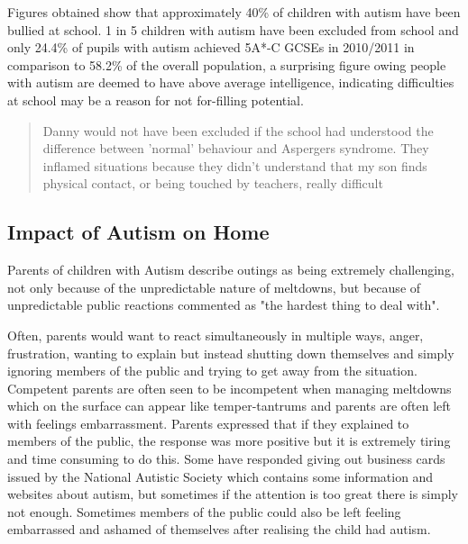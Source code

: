 \documentclass[11pt]{report}
\begin{document}
Figures obtained show that approximately 40\% of children with autism have been bullied at school. 1 in 5 children with autism have been excluded from school \cite{nasschool} and only 24.4\% of pupils with autism achieved 5A*-C GCSEs in 2010/2011 in comparison to 58.2\% of the overall population\cite{statsandfacts}, a surprising figure owing people with autism are deemed to have above average intelligence, indicating difficulties at school may be a reason for not for-filling potential. 

\begin{quote}
Danny would not have been excluded if the school had understood the difference between 'normal' behaviour and Aspergers syndrome. They inflamed situations because they didn't understand that my son finds physical contact, or being touched by teachers, really difficult \cite{nasschool}
\end{quote}


\subsection{Impact of Autism on Home}
Parents of children with Autism describe outings as being extremely challenging, not only because of the unpredictable nature of meltdowns, but because of unpredictable public reactions\cite{meltdowns_goingout} commented as "the hardest thing to deal with"\cite{meltdowns_goingout}.

Often, parents would want to react simultaneously in multiple ways, anger, frustration, wanting to explain but instead shutting down themselves and simply ignoring members of the public and trying to get away from the situation\cite{meltdowns_goingout}. Competent parents are often seen to be incompetent when managing meltdowns which on the surface can appear like temper-tantrums and parents are often left with feelings embarrassment\cite{meltdowns_goingout}. Parents expressed that if they explained to members of the public, the response was more positive but it is extremely tiring and time consuming to do this\cite{meltdowns_goingout}. Some have responded giving out business cards issued by the National Autistic Society which contains some information and websites about autism, but sometimes if the attention is too great there is simply not enough. Sometimes members of the public could also be left feeling embarrassed and ashamed of themselves after realising the child had autism\cite{meltdowns_goingout}.  
\end{document}
